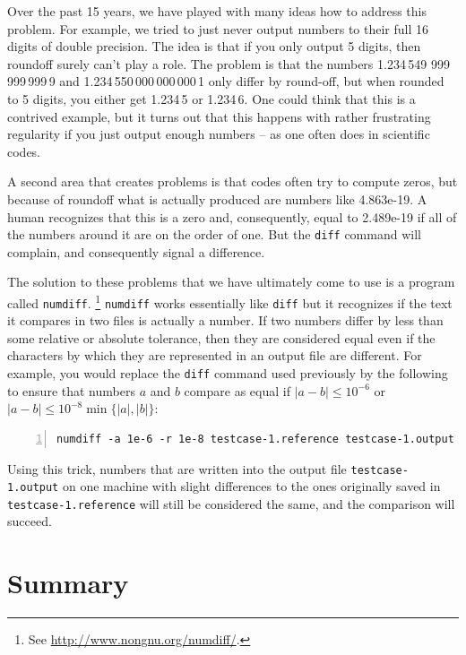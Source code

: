 \documentclass{article}
\begin{document}
Over the past 15 years, we have played with many ideas how to address this
problem. For example, we tried to just never output numbers to their full 16
digits of double precision. The idea is that if you only output 5 digits, then
roundoff surely can't play a role. The problem is that the numbers 1.234\,549
999\,999\,999\,9 and 1.234\,550\,000\,000\,000\,1 only differ by round-off,
but when rounded to 5 digits, you either get 1.234\,5 or 1.234\,6. One could
think that this is a contrived example, but it turns out that this happens
with rather frustrating regularity if you just output enough numbers -- as one
often does in scientific codes.

A second area that creates problems is that codes often try to compute zeros, but
because of roundoff what is actually produced are numbers like
4.863e-19. A human recognizes that this is a zero and, consequently, equal to
2.489e-19 if all of the numbers around it are on the order of one. But the
\texttt{diff} command will complain, and consequently signal a difference.

The solution to these problems that we have ultimately come to use
is a program called \texttt{numdiff}.%
\footnote{See \url{http://www.nongnu.org/numdiff/}.}
\texttt{numdiff} works essentially like
\texttt{diff} but it recognizes if the text it compares in two files is
actually a number. If two numbers differ by less than some relative or
absolute tolerance, then they are considered equal even if the characters by
which they are represented in an output file are different. For example, you
would replace the \texttt{diff} command used previously by the
following to ensure that numbers $a$ and $b$ compare as equal if $|a-b|\le
10^{-6}$ or $|a-b|\le 10^{-8} \min\{|a|,|b|\}$:
\begin{lstlisting}[frame=single,basicstyle=\footnotesize,numbers=left,language=csh]
  numdiff -a 1e-6 -r 1e-8 testcase-1.reference testcase-1.output
\end{lstlisting}
Using this trick, numbers that are written into the output file
\texttt{testcase-1.output} on one machine with slight differences to the
ones originally saved in \texttt{testcase-1.reference} will still be considered
the same, and the comparison will succeed.



\section{Summary}
\label{sec:conclusions}
\end{document}
